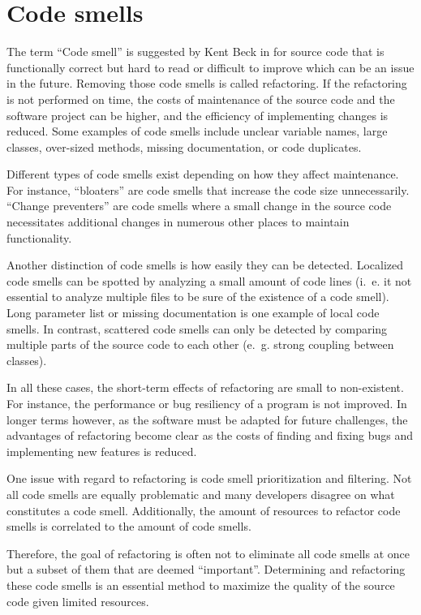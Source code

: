 \section{Code smells}\label{sec:code_smell}

The term \enquote{Code smell} is suggested by Kent Beck in \cite{fowler2019refactoring} for source code that is functionally correct but hard to read or difficult to improve which can be an issue in the future. Removing those code smells is called refactoring. If the refactoring is not performed on time, the costs of maintenance of the source code and the software project can be higher, and the efficiency of implementing changes is reduced. Some examples of code smells include unclear variable names, large classes, over-sized methods, missing documentation, or code duplicates. 

Different types of code smells exist depending on how they affect maintenance. For instance, \enquote{bloaters} are code smells that increase the code size unnecessarily. \enquote{Change preventers} are code smells where a small change in the source code necessitates additional changes in numerous other places to maintain functionality. \cite{data_clumps_refactoring_guru}


Another distinction of code smells is how easily they can be detected. Localized code smells can be spotted by analyzing a small amount of code lines (i.~e. it not essential to analyze multiple files to be sure of the existence of a code smell). Long parameter list or missing documentation is one example of local code smells.  In contrast, scattered code smells can only be detected by comparing multiple parts of the source code to each other (e.~g. strong coupling between classes). \cite{code_smell_survival}

In all these cases, the short-term effects of refactoring are small to non-existent. For instance, the performance or bug resiliency of a program is not improved. In longer terms however, as the software must be adapted for future challenges, the advantages of refactoring become clear as the costs of finding and fixing bugs and implementing new features is reduced. 

One issue with regard to refactoring is code smell prioritization and filtering. Not all code smells are equally problematic and many developers disagree on what constitutes a code smell. Additionally,  the amount of resources to refactor code smells is correlated to the amount of code smells. \cite{10.1007/978-981-13-8300-7_21}

Therefore, the goal of refactoring is often not to eliminate all code smells at once but a subset of them that are deemed \enquote{important}. Determining and refactoring these code smells is an essential method to maximize the quality of the source code  given limited resources. \cite{code_smell_prio} 